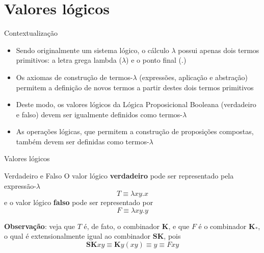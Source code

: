 \section{Valores lógicos}

\begin{frame}[fragile]{Contextualização}

    \begin{itemize}
        \item Sendo originalmente um sistema lógico, o cálculo $\lambda$ possui apenas
            dois termos primitivos: a letra grega lambda ($\lambda$) e o ponto final ($.$)

        \item Os axiomas de construção de termos-$\lambda$ (expressões, aplicação e abstração)
            permitem a definição de novos termos a partir destes dois termos primitivos

        \item Deste modo, os valores lógicos da Lógica Proposicional Booleana (verdadeiro e falso)
            devem ser igualmente definidos como termos-$\lambda$

        \item As operações lógicas, que permitem a construção de proposições compostas, também
            devem ser definidas como termos-$\lambda$
    \end{itemize}

\end{frame}

\begin{frame}[fragile]{Valores lógicos}

    \begin{block}{Verdadeiro e Falso}
        O valor lógico \textbf{verdadeiro} pode ser representado pela expressão-$\lambda$
        \[
            T \equiv \lambda xy.x
        \] e o valor lógico \textbf{falso} pode ser representado por
        \[
            F \equiv \lambda xy.y
        \]
    \end{block}

    \vspace{0.1in}

    \textbf{Observação}: veja que $T$ é, de fato, o combinador $\mathbf{K}$, e que $F$ é o 
    combinador $\mathbf{K_*}$, o qual é extensionalmente igual ao combinador $\mathbf{SK}$, pois
    \[
        \mathbf{SK}xy \equiv \mathbf{K}y(xy) \equiv y \equiv Fxy
    \]
\end{frame}

